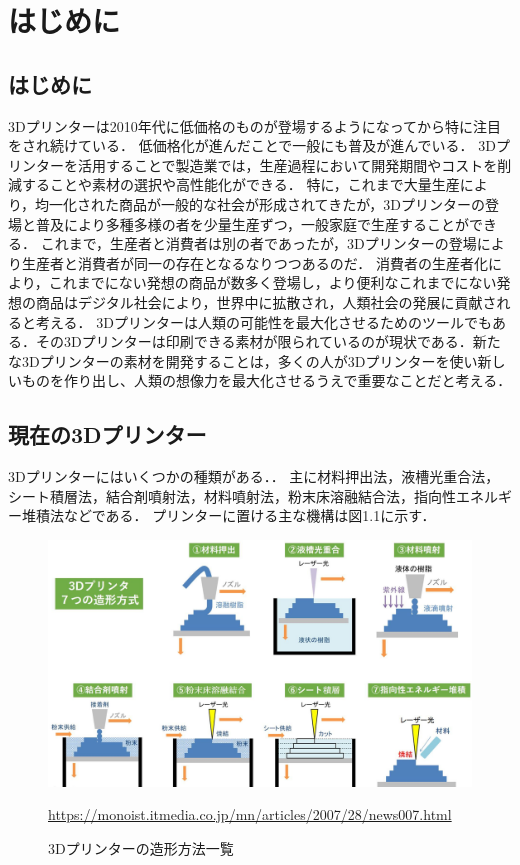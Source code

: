 \chapter{はじめに}
\label{chp:first}

\section{はじめに}
\label{sec:paragraph}

3Dプリンターは2010年代に低価格のものが登場するようになってから特に注目をされ続けている．
低価格化が進んだことで一般にも普及が進んでいる．
3Dプリンターを活用することで製造業では，生産過程において開発期間やコストを削減することや素材の選択や高性能化ができる．
特に，これまで大量生産により，均一化された商品が一般的な社会が形成されてきたが，3Dプリンターの登場と普及により多種多様の者を少量生産ずつ，一般家庭で生産することができる．
これまで，生産者と消費者は別の者であったが，3Dプリンターの登場により生産者と消費者が同一の存在となるなりつつあるのだ． 消費者の生産者化により，これまでにない発想の商品が数多く登場し，より便利なこれまでにない発想の商品はデジタル社会により，世界中に拡散され，人類社会の発展に貢献されると考える．
3Dプリンターは人類の可能性を最大化させるためのツールでもある．その3Dプリンターは印刷できる素材が限られているのが現状である．新たな3Dプリンターの素材を開発することは，多くの人が3Dプリンターを使い新しいものを作り出し、人類の想像力を最大化させるうえで重要なことだと考える．


\section{現在の3Dプリンター}
\label{sec:paragraph}

3Dプリンターにはいくつかの種類がある．．
主に材料押出法，液槽光重合法，シート積層法，結合剤噴射法，材料噴射法，粉末床溶融結合法，指向性エネルギー堆積法などである．
プリンターに置ける主な機構は図1.1に示す．

\begin{figure}[H]
  \centering
  \includegraphics[width=15truecm]{./fig/3Dprinter.jpg}
  \caption{3Dプリンターの造形方法一覧}
  \url{https://monoist.itmedia.co.jp/mn/articles/2007/28/news007.html} %
  \label{fig:ゲル}
\end{figure}

